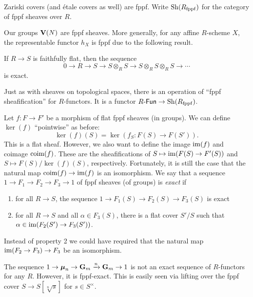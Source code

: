 \documentclass{article}
\begin{document}
Zariski covers (and \'etale covers as well) are fppf. Write 
$\operatorname{Sh}(R_{\mathrm{fppf}})$ for the category of fppf sheaves over $R$. 

\begin{example}
Our groups $\mathbf{V}(N)$ are fppf sheaves. More generally, for any affine $R$-scheme 
$X$, the representable functor $h_X$ is fppf due to the following result. 
\end{example}

\begin{proposition}[Grothendieck]
If $R\to S$ is faithfully flat, then the sequence 
\[
  0 \to R \to S \to S\otimes_R S \to S\otimes_R S \otimes_R S \to \cdots
\]
is exact. 
\end{proposition}

Just as with sheaves on topological spaces, there is an operation of 
``fppf sheafification'' for $R$-functors. It is a functor 
$R\textnormal{-}\mathsf{Fun}\to \operatorname{Sh}(R_{\mathrm{fppf}})$. 

Let $f:F\to F'$ be a morphism of flat fppf sheaves (in groups). We can define 
$\ker(f)$ ``pointwise'' as before: 
\[
  \ker(f)(S) = \ker(f_S:F(S) \to F(S')) .
\]
This is a flat sheaf. However, we also want to define the image 
$\operatorname{im}(f)$ and coimage $\operatorname{coim}(f)$. These are the sheafifications of 
$S\mapsto \operatorname{im}(F(S)\to F'(S))$ and $S\mapsto F(S)/\ker(f)(S)$, 
respectively. Fortunately, it is still the case that the natural map 
$\operatorname{coim}(f) \to \operatorname{im}(f)$ is an isomorphism. We say that a sequence 
$1 \to F_1 \to F_2 \to F_3 \to 1$ of fppf sheaves (of groups) is \emph{exact} 
if 
\begin{enumerate}
  \item for all $R\to S$, the sequence $1\to F_1(S) \to F_2(S)\to F_3(S)$ is exact 
  \item for all $R\to S$ and all $\alpha\in F_3(S)$, there is a flat cover 
    $S'/S$ such that $\alpha\in \operatorname{im}(F_2(S') \to F_3(S'))$. 
\end{enumerate}

Instead of property 2 we could have required that the natural map 
$\operatorname{im}(F_2\to F_3) \to F_3$ be an isomorphism. 

\begin{example}
The sequence $1 \to \boldsymbol\mu_n \to \mathbf{G}_m \xrightarrow n \mathbf{G}_m \to 1$ is 
not an exact sequence of $R$-functors for any $R$. However, it is fppf-exact. 
This is easily seen via lifting over the fppf cover 
$S\to S[\sqrt[n] s]$ for $s\in S^\times$. 
\end{example}
\end{document}
